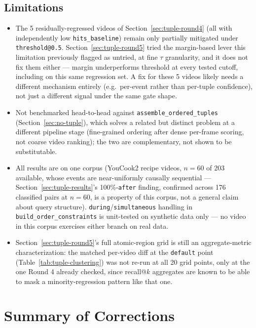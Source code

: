 \documentclass[11pt]{article}
\newcommand{\code}[1]{\texttt{\small #1}}
\begin{document}
\subsection{Limitations}
\begin{itemize}[nosep]
  \item The 5 residually-regressed videos of Section~\ref{sec:tuple-round4} (all with
    independently low \code{hits\_baseline}) remain only partially mitigated under
    \code{threshold@0.5}. Section~\ref{sec:tuple-round5} tried the margin-based lever this
    limitation previously flagged as untried, at fine $\tau$ granularity, and it does not fix
    them either --- margin underperforms threshold at every tested cutoff, including on this
    same regression set. A fix for these 5 videos likely needs a different mechanism entirely
    (e.g.\ per-event rather than per-tuple confidence), not just a different signal under the
    same gate shape.
  \item Not benchmarked head-to-head against \code{assemble\_ordered\_tuples}
    (Section~\ref{sec:no-tuple}), which solves a related but distinct problem
    at a different pipeline stage (fine-grained ordering after dense
    per-frame scoring, not coarse video ranking); the two are complementary,
    not shown to be substitutable.
  \item All results are on one corpus (YouCook2 recipe videos, $n=60$ of 203
    available, whose events are near-uniformly causally sequential ---
    Section~\ref{sec:tuple-results}'s 100\%-\code{after} finding, confirmed
    across 176 classified pairs at $n=60$, is a property of this corpus, not
    a general claim about query structure). \code{during}/\code{simultaneous}
    handling in \code{build\_order\_constraints} is unit-tested on synthetic
    data only --- no video in this corpus exercises either branch on real
    data.
  \item Section~\ref{sec:tuple-round5}'s full atomic-region grid is still an aggregate-metric
    characterization: the matched per-video diff at the \code{default} point
    (Table~\ref{tab:tuple-clustering}) was not re-run at all 20 grid points, only at the one
    Round 4 already checked, since recall@$k$ aggregates are known to be able to mask a
    minority-regression pattern like that one.
\end{itemize}

\section{Summary of Corrections}
\label{sec:corrections}
\end{document}
